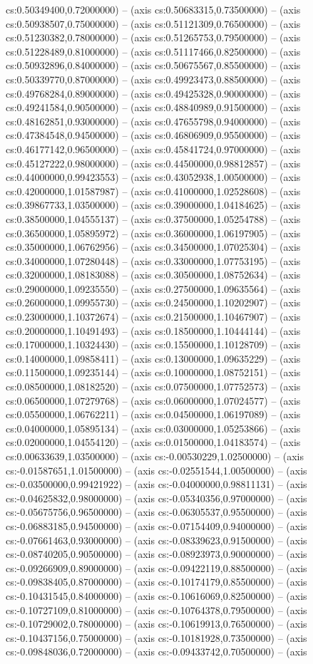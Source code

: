 cs:0.50349400,0.72000000) -- (axis cs:0.50683315,0.73500000) -- (axis cs:0.50938507,0.75000000) -- (axis cs:0.51121309,0.76500000) -- (axis cs:0.51230382,0.78000000) -- (axis cs:0.51265753,0.79500000) -- (axis cs:0.51228489,0.81000000) -- (axis cs:0.51117466,0.82500000) -- (axis cs:0.50932896,0.84000000) -- (axis cs:0.50675567,0.85500000) -- (axis cs:0.50339770,0.87000000) -- (axis cs:0.49923473,0.88500000) -- (axis cs:0.49768284,0.89000000) -- (axis cs:0.49425328,0.90000000) -- (axis cs:0.49241584,0.90500000) -- (axis cs:0.48840989,0.91500000) -- (axis cs:0.48162851,0.93000000) -- (axis cs:0.47655798,0.94000000) -- (axis cs:0.47384548,0.94500000) -- (axis cs:0.46806909,0.95500000) -- (axis cs:0.46177142,0.96500000) -- (axis cs:0.45841724,0.97000000) -- (axis cs:0.45127222,0.98000000) -- (axis cs:0.44500000,0.98812857) -- (axis cs:0.44000000,0.99423553) -- (axis cs:0.43052938,1.00500000) -- (axis cs:0.42000000,1.01587987) -- (axis cs:0.41000000,1.02528608) -- (axis cs:0.39867733,1.03500000) -- (axis cs:0.39000000,1.04184625) -- (axis cs:0.38500000,1.04555137) -- (axis cs:0.37500000,1.05254788) -- (axis cs:0.36500000,1.05895972) -- (axis cs:0.36000000,1.06197905) -- (axis cs:0.35000000,1.06762956) -- (axis cs:0.34500000,1.07025304) -- (axis cs:0.34000000,1.07280448) -- (axis cs:0.33000000,1.07753195) -- (axis cs:0.32000000,1.08183088) -- (axis cs:0.30500000,1.08752634) -- (axis cs:0.29000000,1.09235550) -- (axis cs:0.27500000,1.09635564) -- (axis cs:0.26000000,1.09955730) -- (axis cs:0.24500000,1.10202907) -- (axis cs:0.23000000,1.10372674) -- (axis cs:0.21500000,1.10467907) -- (axis cs:0.20000000,1.10491493) -- (axis cs:0.18500000,1.10444144) -- (axis cs:0.17000000,1.10324430) -- (axis cs:0.15500000,1.10128709) -- (axis cs:0.14000000,1.09858411) -- (axis cs:0.13000000,1.09635229) -- (axis cs:0.11500000,1.09235144) -- (axis cs:0.10000000,1.08752151) -- (axis cs:0.08500000,1.08182520) -- (axis cs:0.07500000,1.07752573) -- (axis cs:0.06500000,1.07279768) -- (axis cs:0.06000000,1.07024577) -- (axis cs:0.05500000,1.06762211) -- (axis cs:0.04500000,1.06197089) -- (axis cs:0.04000000,1.05895134) -- (axis cs:0.03000000,1.05253866) -- (axis cs:0.02000000,1.04554120) -- (axis cs:0.01500000,1.04183574) -- (axis cs:0.00633639,1.03500000) -- (axis cs:-0.00530229,1.02500000) -- (axis cs:-0.01587651,1.01500000) -- (axis cs:-0.02551544,1.00500000) -- (axis cs:-0.03500000,0.99421922) -- (axis cs:-0.04000000,0.98811131) -- (axis cs:-0.04625832,0.98000000) -- (axis cs:-0.05340356,0.97000000) -- (axis cs:-0.05675756,0.96500000) -- (axis cs:-0.06305537,0.95500000) -- (axis cs:-0.06883185,0.94500000) -- (axis cs:-0.07154409,0.94000000) -- (axis cs:-0.07661463,0.93000000) -- (axis cs:-0.08339623,0.91500000) -- (axis cs:-0.08740205,0.90500000) -- (axis cs:-0.08923973,0.90000000) -- (axis cs:-0.09266909,0.89000000) -- (axis cs:-0.09422119,0.88500000) -- (axis cs:-0.09838405,0.87000000) -- (axis cs:-0.10174179,0.85500000) -- (axis cs:-0.10431545,0.84000000) -- (axis cs:-0.10616069,0.82500000) -- (axis cs:-0.10727109,0.81000000) -- (axis cs:-0.10764378,0.79500000) -- (axis cs:-0.10729002,0.78000000) -- (axis cs:-0.10619913,0.76500000) -- (axis cs:-0.10437156,0.75000000) -- (axis cs:-0.10181928,0.73500000) -- (axis cs:-0.09848036,0.72000000) -- (axis cs:-0.09433742,0.70500000) -- (axis 